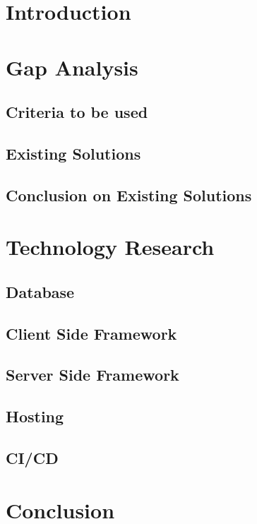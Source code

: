 \section{Introduction}
\section{Gap Analysis}
\subsection{Criteria to be used}
\subsection{Existing Solutions}
\subsection{Conclusion on Existing Solutions}
\section{Technology Research}
\subsection{Database}
\subsection{Client Side Framework}
\subsection{Server Side Framework}
\subsection{Hosting}
\subsection{CI/CD}
\section{Conclusion}